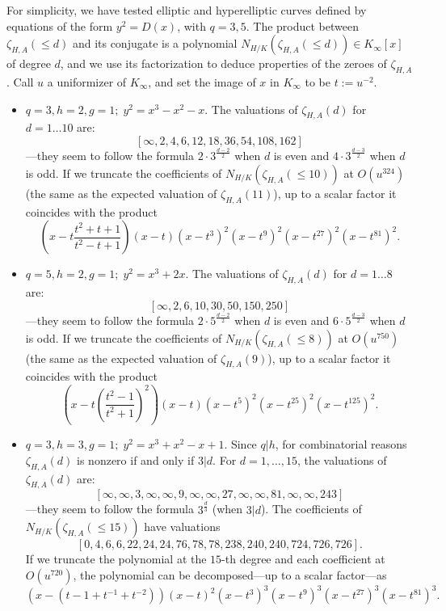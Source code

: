 \documentclass[11pt]{amsart}
\numberwithin{equation}{section}
\begin{document}
For simplicity, we have tested elliptic and hyperelliptic curves defined by equations of the form $y^2=D(x)$, with $q=3,5$. The product between $\zeta_{H,A}(\le d)$ and its conjugate is a polynomial $N_{H/K}(\zeta_{H,A}(\le d))\in K_\infty[x]$ of degree $d$, and we use its factorization to deduce properties of the zeroes of $\zeta_{H,A}$. Call $u$ a uniformizer of $K_\infty$, and set the image of $x$ in $K_\infty$ to be $t:=u^{-2}$.
\begin{itemize}
    \item$\boxed{q=3,h=2,g=1;\;y^2=x^3-x^2-x}$. The valuations of $\zeta_{H,A}(d)$ for $d=1\dots10$ are:
    \[[\infty,2,4,6,12,18,36,54,108,162]\]
    ---they seem to follow the formula $2\cdot 3^{\frac{d-2}{2}}$ when $d$ is even and $4\cdot 3^{\frac{d-3}{2}}$ when $d$ is odd.
    If we truncate the coefficients of $N_{H/K}(\zeta_{H,A}(\le 10))$ at $O(u^{324})$ (the same as the expected valuation of $\zeta_{H,A}(11)$), up to a scalar factor it coincides with the product
    \[\left(x-t\frac{t^2+t+1}{t^2-t+1}\right)(x-t)(x-t^3)^2(x-t^9)^2(x-t^{27})^2(x-t^{81})^2.\]

    \item$\boxed{q=5,h=2,g=1;\;y^2=x^3+2x}$. The valuations of $\zeta_{H,A}(d)$ for $d=1\dots8$ are:
    \[[\infty,2,6,10,30,50,150,250]\]
    ---they seem to follow the formula $2\cdot 5^{\frac{d-2}{2}}$ when $d$ is even and $6\cdot 5^{\frac{d-3}{2}}$ when $d$ is odd. If we truncate the coefficients of $N_{H/K}(\zeta_{H,A}(\le 8))$ at $O(u^{750})$ (the same as the expected valuation of $\zeta_{H,A}(9)$), up to a scalar factor it coincides with the product
    \[\left(x-t\left(\frac{t^2-1}{t^2+1}\right)^2\right)(x-t)(x-t^5)^2(x-t^{25})^2(x-t^{125})^2.\]
    
    \item$\boxed{q=3,h=3,g=1;\;y^2=x^3+x^2-x+1}$. Since $q|h$, for combinatorial reasons $\zeta_{H,A}(d)$ is nonzero if and only if $3|d$. For $d=1,\dots,15$, the valuations of $\zeta_{H,A}(d)$ are:
    \[[\infty,\infty,3,\infty,\infty,9,\infty,\infty,27,\infty,\infty,81,\infty,\infty,243]\]
    ---they seem to follow the formula $3^{\frac{d}{3}}$ (when $3|d$).
    The coefficients of $N_{H/K}(\zeta_{H,A}(\le15))$ have valuations 
    \[[ 0, 4, 6, 6, 22, 24, 24, 76, 78, 78, 238, 240, 240, 724, 726, 726 ].\]
    If we truncate the polynomial at the $15$-th degree and each coefficient at $O(u^{720})$, the polynomial can be decomposed---up to a scalar factor---as \[(x-(t-1+t^{-1}+t^{-2}))(x-t)^2(x-t^3)^3(x-t^9)^3(x-t^{27})^3(x-t^{81})^3.\]
    

\end{itemize}
\end{document}
